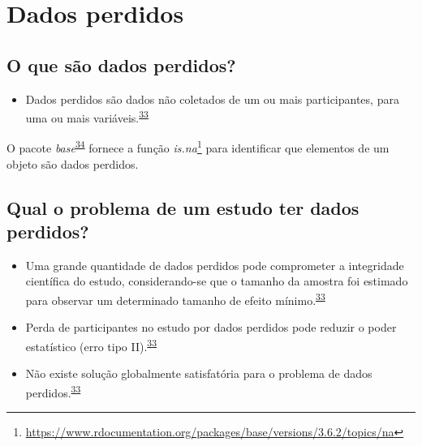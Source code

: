 \documentclass[
  a4paper,
]{book}
\providecommand{\tightlist}{%
  \setlength{\itemsep}{0pt}\setlength{\parskip}{0pt}}
\renewcommand{\href}[2]{#2\footnote{\url{#1}}}
\newenvironment{infobox}[1]
  {
  \begin{itemize}
  \renewcommand{\labelitemi}{
    \raisebox{-.7\height}[0pt][0pt]{
      {\setkeys{Gin}{width=3em,keepaspectratio}
        \texttt{[image: \#1]}}
    }
  }
  \setlength{\fboxsep}{1em}
  \begin{blackbox}
  \item
  }
  {
  \end{blackbox}
  \end{itemize}
  }
\begin{document}
\hypertarget{dados-perdidos}{%
\section{Dados perdidos}\label{dados-perdidos}}

\hypertarget{o-que-suxe3o-dados-perdidos}{%
\subsection{O que são dados perdidos?}\label{o-que-suxe3o-dados-perdidos}}

\begin{itemize}
\tightlist
\item
  Dados perdidos são dados não coletados de um ou mais participantes, para uma ou mais variáveis.\textsuperscript{\protect\hyperlink{ref-Altman2007}{33}}
\end{itemize}

\begin{infobox}{images/Rlogo}
O pacote \emph{base}\textsuperscript{\protect\hyperlink{ref-base-2}{34}} fornece a função \href{https://www.rdocumentation.org/packages/base/versions/3.6.2/topics/na}{\emph{is.na}} para identificar que elementos de um objeto são dados perdidos.

\end{infobox}

\hypertarget{qual-o-problema-de-um-estudo-ter-dados-perdidos}{%
\subsection{Qual o problema de um estudo ter dados perdidos?}\label{qual-o-problema-de-um-estudo-ter-dados-perdidos}}

\begin{itemize}
\item
  Uma grande quantidade de dados perdidos pode comprometer a integridade científica do estudo, considerando-se que o tamanho da amostra foi estimado para observar um determinado tamanho de efeito mínimo.\textsuperscript{\protect\hyperlink{ref-Altman2007}{33}}
\item
  Perda de participantes no estudo por dados perdidos pode reduzir o poder estatístico (erro tipo II).\textsuperscript{\protect\hyperlink{ref-Altman2007}{33}}
\item
  Não existe solução globalmente satisfatória para o problema de dados perdidos.\textsuperscript{\protect\hyperlink{ref-Altman2007}{33}}
\end{itemize}
\end{document}
